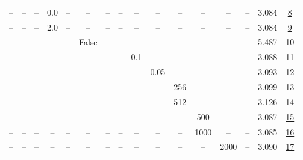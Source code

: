 \begin{table}[H]
\begin{tabular}{cccccccccccccccc}
-- & -- & -- & 0.0 & -- & -- & -- & -- & -- & -- & -- & -- & -- & -- & 3.084 & \href{https://wandb.ai/stanford-mercury/optimizer-scaling/runs/sweep-520m-10B-krona6ace9lr0.001-wd0.5-b10.95-plr0.2-pis1-gn0.0--04c9a1}{8} \\
-- & -- & -- & 2.0 & -- & -- & -- & -- & -- & -- & -- & -- & -- & -- & 3.084 & \href{https://wandb.ai/stanford-mercury/optimizer-scaling/runs/sweep-520m-10B-kron3b9e66lr0.001-wd0.5-b10.95-plr0.2-pis1-gn2.0--0c6f01}{9} \\
-- & -- & -- & -- & -- & False & -- & -- & -- & -- & -- & -- & -- & -- & 5.487 & \href{https://wandb.ai/stanford-mercury/optimizer-scaling/runs/sweep-520m-10B-kronb8e354lr0.001-wd0.5-b10.95-plr0.2-pis1-gn1-no-928921}{10} \\
-- & -- & -- & -- & -- & -- & -- & -- & 0.1 & -- & -- & -- & -- & -- & 3.088 & \href{https://wandb.ai/stanford-mercury/optimizer-scaling/runs/sweep-520m-10B-kron2ec659lr0.001-wd0.5-b10.95-plr0.1-pis1-gn1-no-22bed3}{11} \\
-- & -- & -- & -- & -- & -- & -- & -- & -- & 0.05 & -- & -- & -- & -- & 3.093 & \href{https://wandb.ai/stanford-mercury/optimizer-scaling/runs/sweep-520m-10B-kron2f3c38lr0.001-wd0.5-b10.95-plr0.2-pis1-gn1-no-99d3a4}{12} \\
-- & -- & -- & -- & -- & -- & -- & -- & -- & -- & 256 & -- & -- & -- & 3.099 & \href{https://wandb.ai/stanford-mercury/optimizer-scaling/runs/sweep-520m-10B-kron798587lr0.001-wd0.5-b10.95-plr0.2-pis1-gn1-no-fcd346}{13} \\
-- & -- & -- & -- & -- & -- & -- & -- & -- & -- & 512 & -- & -- & -- & 3.126 & \href{https://wandb.ai/stanford-mercury/optimizer-scaling/runs/sweep-520m-10B-kron8f965elr0.001-wd0.5-b10.95-plr0.2-pis1-gn1-no-589914}{14} \\
-- & -- & -- & -- & -- & -- & -- & -- & -- & -- & -- & 500 & -- & -- & 3.087 & \href{https://wandb.ai/stanford-mercury/optimizer-scaling/runs/sweep-520m-10B-krona2e0delr0.001-wd0.5-b10.95-plr0.2-pis1-gn1-no-f9eafc}{15} \\
-- & -- & -- & -- & -- & -- & -- & -- & -- & -- & -- & 1000 & -- & -- & 3.085 & \href{https://wandb.ai/stanford-mercury/optimizer-scaling/runs/sweep-520m-10B-kron4297d5lr0.001-wd0.5-b10.95-plr0.2-pis1-gn1-no-b6a2c5}{16} \\
-- & -- & -- & -- & -- & -- & -- & -- & -- & -- & -- & -- & 2000 & -- & 3.090 & \href{https://wandb.ai/stanford-mercury/optimizer-scaling/runs/sweep-520m-10B-kron7f1bb9lr0.001-wd0.5-b10.95-plr0.2-pis1-gn1-no-4a18ea}{17} \\

\end{tabular}
\end{table}
